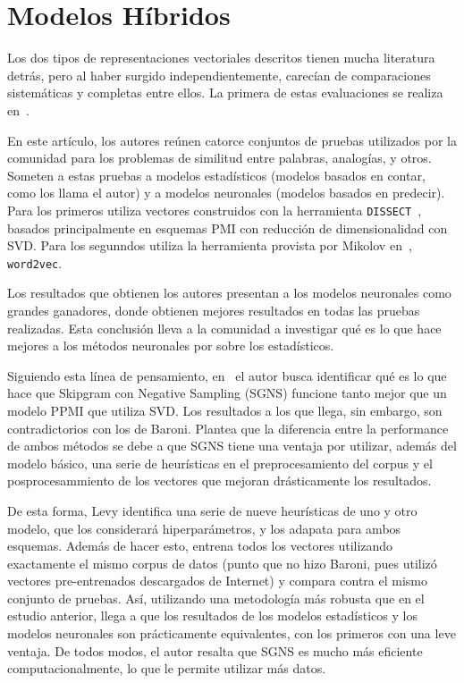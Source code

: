 \section{Modelos Híbridos}

Los dos tipos de representaciones vectoriales descritos tienen mucha literatura detrás, pero al
haber surgido independientemente, carecían de comparaciones sistemáticas y completas entre ellos. La
primera de estas evaluaciones se realiza en~\cite{Baroni2014}.

En este artículo, los autores reúnen catorce conjuntos de pruebas utilizados por la comunidad para
los problemas de similitud entre palabras, analogías, y otros. Someten a estas pruebas a modelos
estadísticos (modelos basados en contar, como los llama el autor) y a modelos neuronales (modelos
basados en predecir). Para los primeros utiliza vectores construidos con la herramienta
\texttt{DISSECT}~\cite{Dinu2013}, basados principalmente en esquemas PMI con reducción de
dimensionalidad con SVD\@. Para los segunndos utiliza la herramienta provista por Mikolov
en~\cite{Mikolov2013c}, \texttt{word2vec}.

Los resultados que obtienen los autores presentan a los modelos neuronales como grandes ganadores,
donde obtienen mejores resultados en todas las pruebas realizadas. Esta conclusión lleva a la
comunidad a investigar qué es lo que hace mejores a los métodos neuronales por sobre los
estadísticos.

Siguiendo esta línea de pensamiento, en~\cite{Levy2015} el autor busca identificar qué es lo que
hace que Skipgram con Negative Sampling (SGNS) funcione tanto mejor que un modelo PPMI que utiliza
SVD\@. Los resultados a los que llega, sin embargo, son contradictorios con los de Baroni. Plantea
que la diferencia entre la performance de ambos métodos se debe a que SGNS tiene una ventaja por
utilizar, además del modelo básico, una serie de heurísticas en el preprocesamiento del corpus y el
posprocesammiento de los vectores que mejoran drásticamente los resultados.

De esta forma, Levy identifica una serie de nueve heurísticas de uno y otro modelo, que los
considerará hiperparámetros, y los adapata para ambos esquemas. Además de hacer esto, entrena todos
los vectores utilizando exactamente el mismo corpus de datos (punto que no hizo Baroni, pues utilizó
vectores pre-entrenados descargados de Internet) y compara contra el mismo conjunto de pruebas. Así,
utilizando una metodología más robusta que en el estudio anterior, llega a que los resultados de los
modelos estadísticos y los modelos neuronales son prácticamente equivalentes, con los primeros con
una leve ventaja. De todos modos, el autor resalta que SGNS es mucho más eficiente
computacionalmente, lo que le permite utilizar más datos.


